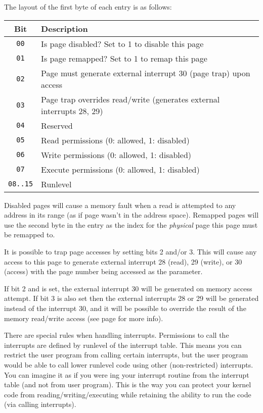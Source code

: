 The layout of the first byte of each entry is as follows:

\singlespacing
\begin{longtable}{|c|p{4.0in}|} \hline
Bit & Description \\ \hline
\texttt{00} & Is page disabled? Set to 1 to disable this page \\ \hline
\texttt{01} & Is page remapped? Set to 1 to remap this page \\ \hline
\texttt{02} & Page must generate external interrupt 30 (page trap) upon access \\ \hline
\texttt{03} & Page trap overrides read/write (generates external interrupts 28, 29)\\ \hline
\texttt{04} & Reserved \\ \hline
\texttt{05} & Read permissions (0: allowed, 1: disabled) \\ \hline
\texttt{06} & Write permissions (0: allowed, 1: disabled) \\ \hline
\texttt{07} & Execute permissions (0: allowed, 1: disabled) \\ \hline
\texttt{08..15} & Runlevel \\ \hline
\end{longtable}
\onehalfspacing

Disabled pages will cause a memory fault when a read is attempted to any address in its range (as if page wasn't in the address space). Remapped pages will use the second byte in the entry as the index for the \emph{physical} page this page must be remapped to.

It is possible to trap page accesses by setting bits 2 and/or 3. This will cause any access to this page to generate external interrupt 28 (read), 29 (write), or 30 (access) with the page number being accessed as the parameter.

If bit 2 and is set, the external interrupt 30 will be generated on memory access attempt. If bit 3 is also set then the external interrupts 28 or 29 will be generated instead of the interrupt 30, and it will be possible to override the result of the memory read/write access (see page \pageref{memoverride} for more info).

\label{interrupthandlingpg}

There are special rules when handling interrupts. Permissions to call the interrupts are defined by runlevel of the interrupt table. This means you can restrict the user program from calling certain interrupts, but the user program would be able to call lower runlevel code using other (non-restricted) interrupts. You can imagine it as if you were ing your interrupt routine from the interrupt table (and not from user program). This is the way you can protect your kernel code from reading/writing/executing while retaining the ability to run the code (via calling interrupts).

